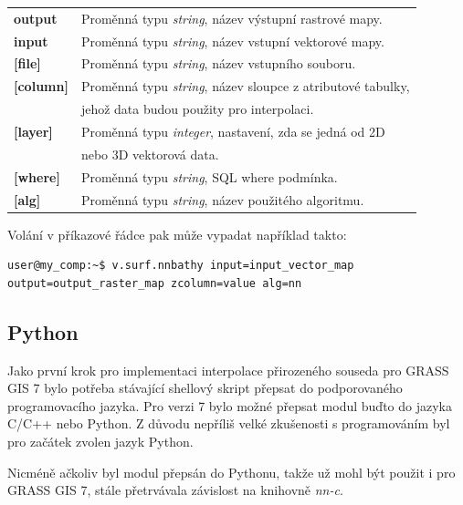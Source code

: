 \documentclass[12pt,a4paper]{article}
\begin{document}
\bigskip
\begin{tabular}{ll}
\textbf{output}& Proměnná typu \emph{string}, název výstupní rastrové mapy.\\
\textbf{input}& Proměnná typu \emph{string}, název vstupní vektorové mapy.\\
\textbf{[file]}& Proměnná typu \emph{string}, název vstupního souboru.\\
\textbf{[column]}& Proměnná typu \emph{string}, název sloupce z atributové tabulky,\\
\textbf{}& jehož data budou použity pro interpolaci.\\
\textbf{[layer]}& Proměnná typu \emph{integer}, nastavení, zda se jedná od 2D \\
\textbf{}& nebo 3D vektorová data.\\
\textbf{[where]}& Proměnná typu \emph{string}, SQL where podmínka.\\
\textbf{[alg]}& Proměnná typu \emph{string}, název použitého algoritmu.\\
\end{tabular}

\newpage
Volání v příkazové řádce pak může vypadat například takto:
\begin{lstlisting}[caption={bash version}]
user@my_comp:~$ v.surf.nnbathy input=input_vector_map output=output_raster_map zcolumn=value alg=nn
\end{lstlisting}

\subsection{Python}
\label{sec:python}

Jako první krok pro implementaci interpolace přirozeného souseda pro
GRASS GIS 7 bylo potřeba stávající shellový skript přepsat do
podporovaného programovacího jazyka. Pro verzi 7 bylo možné přepsat
modul buďto do jazyka C/C++ nebo Python. Z důvodu nepříliš velké
zkušenosti s programováním byl pro začátek zvolen jazyk Python.

Nicméně ačkoliv byl modul přepsán do Pythonu, takže už mohl být 
použit i pro GRASS GIS 7, stále přetrvávala závislost na knihovně \emph{nn-c}.
\end{document}
